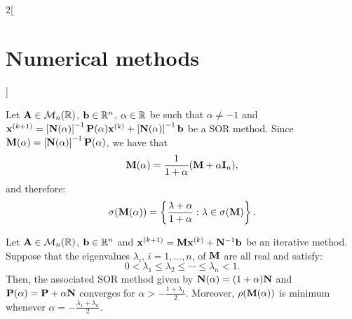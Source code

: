 \documentclass[../../../main.tex]{subfiles}
\begin{document}
\begin{multicols}{2}[\section{Numerical methods}]
\begin{method}
\end{method}
\begin{definition}
    Let $\vb{A}\in\mathcal{M}_n(\mathbb{R})$, $\vb{b}\in\mathbb{R}^n$, $\alpha\in\mathbb{R}$ be such that $\alpha\ne-1$ and $\vb{x}^{(k+1)}=\left[\vb{N}(\alpha)\right]^{-1}\vb{P}(\alpha)\vb{x}^{(k)}+\left[\vb{N}(\alpha)\right]^{-1}\vb{b}$ be a SOR method. Since $\vb{M}(\alpha)=\left[\vb{N}(\alpha)\right]^{-1}\vb{P}(\alpha)$, we have that $$\vb{M}(\alpha)=\frac{1}{1+\alpha}(\vb{M}+\alpha\vb{I}_n),$$ and therefore: $$\sigma(\vb{M}(\alpha))=\left\{\frac{\lambda+\alpha}{1+\alpha}:\lambda\in\sigma(\vb{M})\right\}.$$  
\end{definition}
\begin{theorem}
    Let $\vb{A}\in\mathcal{M}_n(\mathbb{R})$, $\vb{b}\in\mathbb{R}^n$ and $\vb{x}^{(k+1)}=\vb{M}\vb{x}^{(k)}+\vb{N}^{-1}\vb{b}$ be an iterative method. Suppose that the eigenvalues $\lambda_i$, $i=1,\ldots,n$, of $\vb{M}$ are all real and satisfy: $$0<\lambda_1\leq\lambda_2\leq\cdots\leq\lambda_n<1.$$
    Then, the associated SOR method given by $\vb{N}(\alpha)=(1+\alpha)\vb{N}$ and $\vb{P}(\alpha)=\vb{P}+\alpha\vb{N}$ converges for $\alpha>-\frac{1+\lambda_1}{2}$. Moreover, $\rho(\vb{M}(\alpha))$ is minimum whenever $\alpha=-\frac{\lambda_1+\lambda_n}{2}$.
\end{theorem}

\end{multicols}
\end{document}
